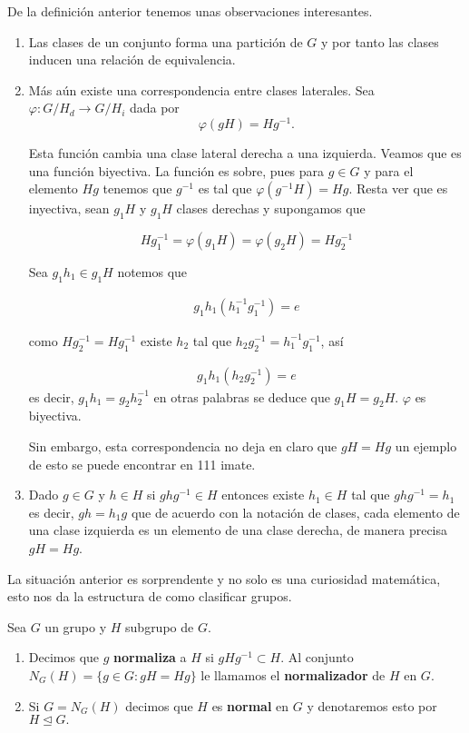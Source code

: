 	\begin{ob}
	De la definición anterior tenemos unas observaciones interesantes. 
	\begin{enumerate}
	\item Las clases de un conjunto forma una partición de $G$ y por tanto las clases inducen una relación de equivalencia.
	
	\item Más aún existe una correspondencia entre clases laterales. 
 Sea $\varphi:G/H_d \to G/H_i$ dada por $$\varphi(gH)=Hg^{-1}.$$
 
  Esta función cambia una clase lateral derecha a una izquierda. Veamos que es una función biyectiva. La función es sobre, pues para $g \in G$ y para el elemento $Hg$ tenemos que $g^{-1}$ es tal que $\varphi(g^{-1}H)=Hg$. Resta ver que es inyectiva, sean $g_1H$ y $g_1H$ clases derechas y supongamos que
	
	 $$Hg_1^{-1}=\varphi(g_1H)=\varphi(g_2H)=Hg_2^{-1}$$ 
	
	Sea $g_1h_1 \in g_1H$ notemos que

	\begin{align*}
	g_1h_1(h_1^{-1}g_1^{-1})=e	
	\end{align*}
	
	como $Hg_2^{-1}=Hg_1^{-1}$ existe $h_2$ tal que $h_2g_2^{-1}=h_1^{-1}g_1^{-1}$, así
	
	\begin{align*}
	g_1h_1(h_2g_2^{-1})=e	
	\end{align*} 
	es decir, $g_1h_1=g_2h_2^{-1}$
	en otras palabras se deduce que $g_1H=g_2H$. $\varphi$ es biyectiva. 
	
	Sin embargo, esta correspondencia no deja en claro que $gH=Hg$ un ejemplo de esto se puede encontrar en 111 imate.
	
	 \item Dado $g \in G$ y $h \in H$ si $ghg^{-1} \in H$ entonces existe $h_1 \in H$ tal que $ghg^{-1}=h_1$ es decir, $gh=h_1g$  que de acuerdo con la notación de clases, cada elemento de una clase izquierda es un elemento de una clase derecha, de manera precisa $gH=Hg$.
	 \end{enumerate}
	\end{ob}
	
	La situación anterior es sorprendente y no solo es una curiosidad matemática, esto nos da la estructura de como clasificar grupos. 
	
\begin{df}
	Sea $G$ un grupo y $H$ subgrupo de $G$.
\begin{enumerate}
	\item  Decimos que $g$ \textbf{normaliza} a $H$ si $gHg^{-1} \subset H.$ Al conjunto $N_G(H)=\{g \in G: gH=Hg\}$ le llamamos el \textbf{normalizador } de $H$ en $G$.
	\item Si $G=N_G(H)$ decimos que $H$ es \textbf{normal} en $G$ y denotaremos esto por $H \unlhd G.$
		
\end{enumerate}
\end{df}
	
